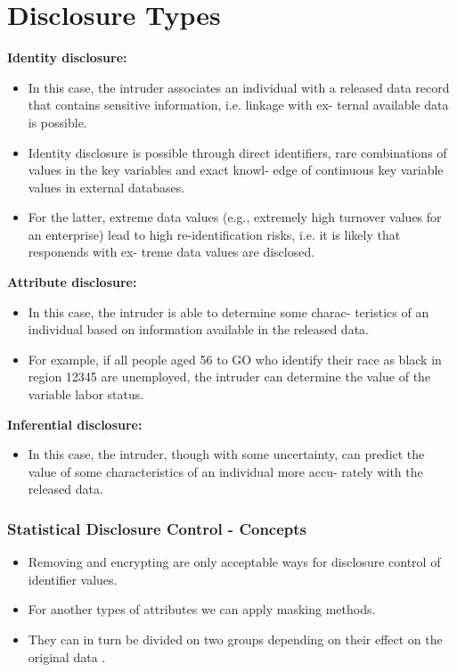 \documentclass{beamer}
\begin{document}
\section*{Disclosure Types}
\begin{frame}
	\textbf{Identity disclosure:}
	\begin{itemize}
		\item In this case, the intruder associates an individual with a released data record that contains sensitive information, i.e. linkage with ex-
		ternal available data is possible.
		\item Identity disclosure is possible through direct
		identifiers, rare combinations of values in the key variables and exact knowl-
		edge of continuous key variable values in external databases. 
		\item For the latter,
		extreme data values (e.g., extremely high turnover values for an enterprise)
		lead to high re-identification risks, i.e. it is likely that responends with ex-
		treme data values are disclosed.
	\end{itemize}
\end{frame}
\begin{frame}
	\textbf{Attribute disclosure:}
	\begin{itemize}
		\item In this case, the intruder is able to determine some charac-
		teristics of an individual based on information available in the released data.
		\item For example, if all people aged 56 to GO who identify their race as black in
		region 12345 are unemployed, the intruder can determine the value of the
		variable labor status.
	\end{itemize}
\end{frame}
\begin{frame}
	\textbf{Inferential disclosure:}
	\begin{itemize}
		
		\item In this case, the intruder, though with some uncertainty,
		can predict the value of some characteristics of an individual more accu-
		rately with the released data.
	\end{itemize}
\end{frame}
\begin{frame}
	\frametitle{Statistical Disclosure Control - Concepts}
	
	\begin{itemize}
		\item Removing and encrypting are only acceptable ways for disclosure control of identifier values. 
		\item For 
		another types of attributes we can apply masking methods.
		\item  They can in turn be divided on two groups 
		depending on their effect on the original data . 
	\end{itemize}
	
\end{frame}
\end{document}
